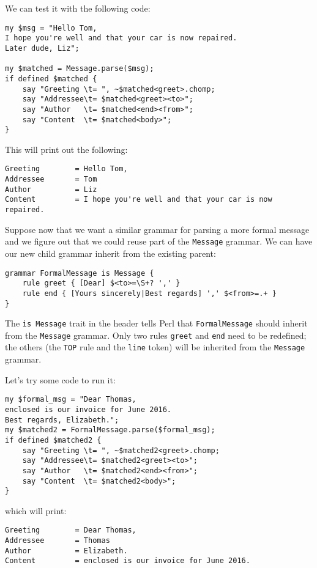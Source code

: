 We can test it with the following code:

\begin{verbatim}
my $msg = "Hello Tom,
I hope you're well and that your car is now repaired.
Later dude, Liz";

my $matched = Message.parse($msg);
if defined $matched { 
    say "Greeting \t= ", ~$matched<greet>.chomp;
    say "Addressee\t= $matched<greet><to>";
    say "Author   \t= $matched<end><from>";
    say "Content  \t= $matched<body>";
}
\end{verbatim}

This will print out the following:

\begin{verbatim}
Greeting        = Hello Tom,
Addressee       = Tom
Author          = Liz
Content         = I hope you're well and that your car is now repaired.
\end{verbatim}

Suppose now that we want a similar grammar for parsing 
a more formal message and we figure out that we could 
reuse part of the {\tt Message} grammar. We can have our 
new child grammar inherit from the existing parent:

\begin{verbatim}
grammar FormalMessage is Message {
    rule greet { [Dear] $<to>=\S+? ',' }
    rule end { [Yours sincerely|Best regards] ',' $<from>=.+ }
}
\end{verbatim}

The {\tt is Message} trait in the header tells Perl that 
{\tt FormalMessage} should inherit from the {\tt Message} grammar. 
Only two rules {\tt greet} and {\tt end} need to be 
redefined; the others (the {\tt TOP} rule 
and the {\tt line} token) will be inherited from the 
{\tt Message} grammar.

Let's try some code to run it:

\begin{verbatim}
my $formal_msg = "Dear Thomas,
enclosed is our invoice for June 2016.
Best regards, Elizabeth.";
my $matched2 = FormalMessage.parse($formal_msg);
if defined $matched2 { 
    say "Greeting \t= ", ~$matched2<greet>.chomp;
    say "Addressee\t= $matched2<greet><to>";
    say "Author   \t= $matched2<end><from>";
    say "Content  \t= $matched2<body>";
}
\end{verbatim}

which will print:

\begin{verbatim}
Greeting        = Dear Thomas,
Addressee       = Thomas
Author          = Elizabeth.
Content         = enclosed is our invoice for June 2016.
\end{verbatim}

